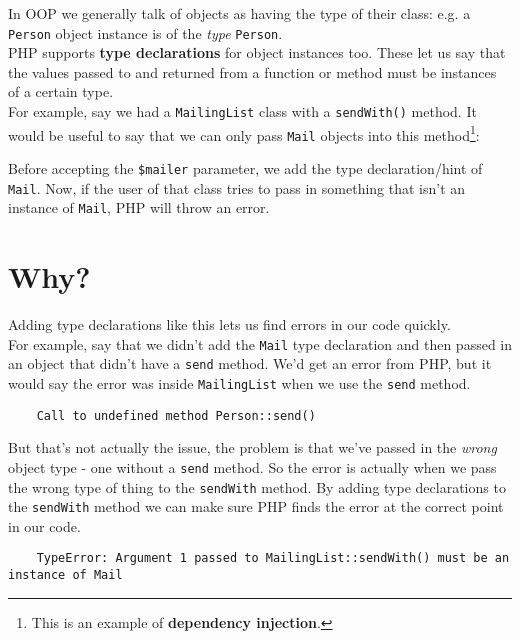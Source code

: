 In OOP we generally talk of objects as having the type of their class: e.g. a \texttt{Person} object instance is of the \textit{type} \texttt{Person}.
\\

PHP supports \textbf{type declarations} for object instances too. These let us say that the values passed to and returned from a function or method must be instances of a certain type.
\\

For example, say we had a \texttt{MailingList} class with a \texttt{sendWith()} method. It would be useful to say that we can only pass \texttt{Mail} objects into this method\footnote{This is an example of \textbf{dependency injection}.}:


Before accepting the \texttt{\$mailer} parameter, we add the type declaration/hint of \texttt{Mail}. Now, if the user of that class tries to pass in something that isn't an instance of \texttt{Mail}, PHP will throw an error.



\section{Why?}

Adding type declarations like this lets us find errors in our code quickly.
\\

For example, say that we didn't add the \texttt{Mail} type declaration and then passed in an object that didn't have a \texttt{send} method. We'd get an error from PHP, but it would say the error was inside \texttt{MailingList} when we use the \texttt{send} method.

\begin{verbatim}
    Call to undefined method Person::send()
\end{verbatim}

But that's not actually the issue, the problem is that we've passed in the \textit{wrong} object type - one without a \texttt{send} method. So the error is actually when we pass the wrong type of thing to the \texttt{sendWith} method. By adding type declarations to the \texttt{sendWith} method we can make sure PHP finds the error at the correct point in our code.

\begin{verbatim}
    TypeError: Argument 1 passed to MailingList::sendWith() must be an instance of Mail
\end{verbatim}



